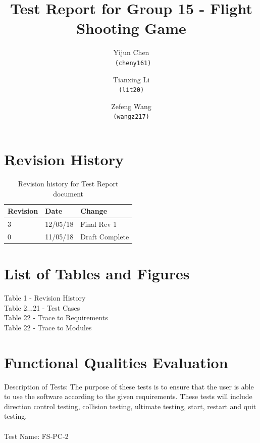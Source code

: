 \documentclass[12,english]{article}
\title{Test Report for Group 15 - Flight Shooting Game}
\author{Yijun Chen\\
\texttt{ (cheny161)}
\and
Tianxing Li\\
\texttt{(lit20)}
\and
Zefeng Wang\\
\texttt{(wangz217)}
}
\date{}
\begin{document}
\maketitle
\newpage
\tableofcontents
\newpage

\section{Revision History}					


\begin{table}[!htbp]

	\begin{tabular}[r]{|l|l|l|}

		\hline		
		\textbf{Revision} & \textbf{Date} & \textbf{Change}\\ 
		\hline
		\color{red}3 & \color{red}12/05/18 & \color{red}Final Rev 1 \\
		\hline
		0 & 11/05/18 & Draft Complete \\ \hline


	\end{tabular}
		\caption{Revision history for Test Report document}
		\label{Table}
\end{table}
	
\section{List of Tables and Figures}
	Table 1 - Revision History\\
	Table 2...21 - Test Cases\\
	Table 22 - Trace to Requirements\\
	Table 22 - Trace to Modules \\

\section{Functional Qualities Evaluation}

	Description of Tests: The purpose of these tests is to ensure that the user is able to use the software according to the given requirements. These tests will include direction control testing, collision testing, ultimate testing, start, restart and quit testing.\\ \\
	
	Test Name: FS-PC-2 \\
	
\end{document}
